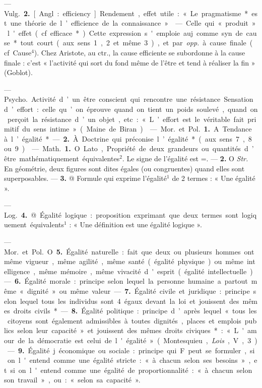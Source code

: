\begin{itemize}[leftmargin=1cm, label=, itemsep=1pt]
— \si{Vulg.} {\bf 2.} [Angl. : efficiency].
Rendement, effet utile : « Le pragmatisme* est une théorie de l’efficience de la connaissance. »

 — Celle qui « produit » l'effet (cf. efficace*). Cette
expression s'emploie auj. comme
syn. de cause* tout court (aux
sens 1, 2 et même 3), et par {\it opp.}
à cause finale (cf. Cause$^4$). Chez
Aristote, au ctr., la cause efficiente
se subordonne à la cause finale :
c’est « l’activité qui sort du fond
même de l’être et tend à réaliser la
fin » (Goblot).

 — \si{Psycho.} Activité d’un être
conscient qui rencontre une résistance. Sensation d’effort : celle qu’on
éprouve quand on tient un poids
soulevé, quand on perçoit la résistance d’un objet, etc. : « L’effort
est le véritable fait primitif du sens
intime » (Maine de Biran).

 — \si{Mor.} et \si{Pol.} {\bf 1.} A
Tendance à l’égalité*. — {\bf 2.} À Doctrine qui préconise l’égalité* (aux
sens 7, 8 ou 9).

 — \si{Math.} {\bf 1.} O Lato, Propriété
de deux grandeurs ou quantités
d’être mathématiquement équivalentes$^2$. Le signe de l'égalité est =.
— {\bf 2.} O {\it Str.} En géométrie, deux
figures sont dites égales (ou congruentes) quand elles sont superposables. — {\bf 3.} @ Formule qui exprime
l'égalité$^1$ de 2 termes : « Une égalité ».

— \si{Log.} {\bf 4.} @ Égalité logique : proposition exprimant que deux termes
sont logiquement équivalents$^1$ :
« Une définition est une égalité logique ».

— \si{Mor.} et \si{Pol.} O {\bf 5.} Égalité naturelle : fait que deux ou plusieurs
hommes ont même vigueur, même
agilité, même santé (égalité physique) ou même intelligence, même
mémoire, même vivacité d'esprit
(égalité intellectuelle). — {\bf 6.} Égalité
morale : principe selon lequel la
personne humaine a partout même
« dignité » ou même valeur. — {\bf 7.}
Égalité civile et juridique : principe
selon lequel tous les individus sont
4 égaux devant la loi et jouissent des
mêmes droits civils*. — {\bf 8.} Égalité
politique : principe d’après lequel
« tous les citoyens sont également
admissibles à toutes dignités, places
et emplois publics selon leur capacité » et jouissent des mêmes droits
civiques* : « L'amour de la démocratie est celui de l'égalité » (Montesquieu, {\it Lois}, V, 3). — {\bf 9.} Égalité
j économique ou sociale : principe qui
F peut se formuler, si on l'entend
comme une égalité stricte : « à
chacun selon ses besoins », et si on
l'entend comme une égalité de proportionnalité : « à chacun selon son
travail », ou : « selon sa capacité ».


\end{itemize}
